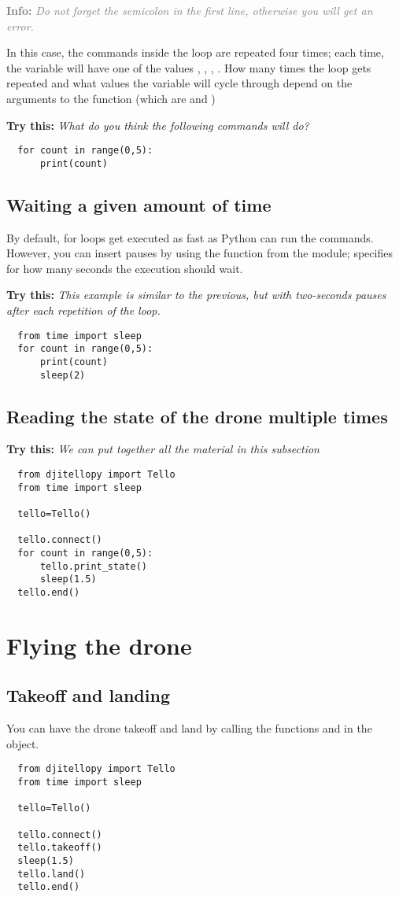 \documentclass[12pt]{article}
\newcommand{\textsfbf}[1]{\textsf{\textbf{#1}}}
\newcommand{\info}[1]{\par\textcolor{gray}{\textsfbf{Info:} \emph{#1}}}
\newcommand{\trythis}[1]{\par\textcolor{DodgerBlue4}{\textsfbf{Try this:} \emph{#1}}}
\begin{document}
\info{Do not forget the semicolon in the first line, otherwise you will get an error.}

In this case, the commands inside the loop are repeated four times; each time, the variable  will have one of the values , , , . How many times the loop gets repeated and what values the variable will cycle through depend on the arguments to the function  (which are  and )

\trythis{What do you think the following commands will do?}
\begin{lstlisting}
  for count in range(0,5):
      print(count)
\end{lstlisting}

\subsection{Waiting a given amount of time}
By default, for loops get executed as fast as Python can run the commands. However, you can insert pauses by using the function  from the  module;  specifies for how many seconds the execution should wait.

\trythis{This example is similar to the previous, but with two-seconds pauses after each repetition of the loop.}
\begin{lstlisting}
  from time import sleep
  for count in range(0,5):
      print(count)
      sleep(2)
\end{lstlisting}

\subsection{Reading the state of the drone multiple times}
\trythis{We can put together all the material in this subsection}
\begin{lstlisting}
  from djitellopy import Tello
  from time import sleep
  
  tello=Tello()
  
  tello.connect()
  for count in range(0,5):
      tello.print_state()
      sleep(1.5)
  tello.end()
\end{lstlisting}

\section{Flying the drone}

\subsection{Takeoff and landing}
You can have the drone takeoff and land by calling the functions  and  in the  object.
\begin{lstlisting}
  from djitellopy import Tello
  from time import sleep
  
  tello=Tello()
  
  tello.connect()
  tello.takeoff()
  sleep(1.5)
  tello.land()
  tello.end()
\end{lstlisting}
\end{document}

